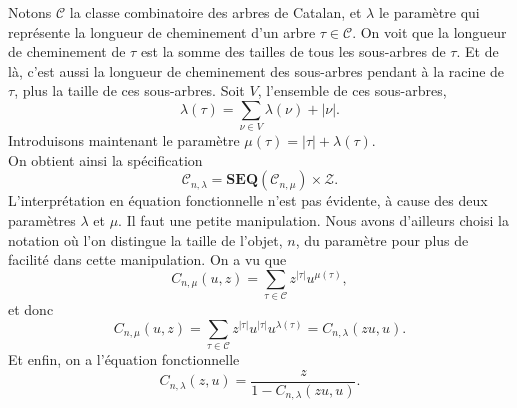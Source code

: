 \documentclass[12pt]{report}
\begin{document}
Notons $\mathcal C$ la classe combinatoire des arbres de Catalan, et $\lambda$ le paramètre qui représente la longueur de cheminement d'un arbre $\tau \in \mathcal C$.
On voit que la longueur de cheminement de $\tau$ est la somme des tailles de tous les sous-arbres de $\tau$. Et de là, c'est aussi la longueur de cheminement des sous-arbres pendant à la racine de $\tau$, plus la taille de ces sous-arbres. Soit $V$, l'ensemble de ces sous-arbres,
$$\lambda(\tau) = \sum_{\nu \in V}\lambda(\nu)+|\nu|.$$
Introduisons maintenant le paramètre $\mu(\tau)=|\tau|+\lambda(\tau)$.\\
On obtient ainsi la spécification 
$$\mathcal {C}_{n,\lambda} = \mathbf{SEQ}(\mathcal C _{n,\mu}) \times \mathcal Z. $$
L'interprétation en équation fonctionnelle n'est pas évidente, à cause des deux paramètres $\lambda$ et $\mu$. Il faut une petite manipulation. Nous avons d'ailleurs choisi la notation où l'on distingue la taille de l'objet, $n$, du paramètre pour plus de facilité dans cette manipulation.
On a vu que
$$C_{n,\mu}(u,z) = \sum_{\tau \in \mathcal C}z^{|\tau|}u^{\mu(\tau)},$$
et donc
$$C_{n,\mu}(u,z) = \sum_{\tau \in \mathcal C}z^{|\tau|}u^{|\tau|}u^{\lambda(\tau)} = C_{n,\lambda}(zu,u).$$
Et enfin, on a l'équation fonctionnelle
$$C_{n,\lambda}(z,u) = \frac{z}{1-C_{n,\lambda}(zu,u)}.$$
\end{document}
